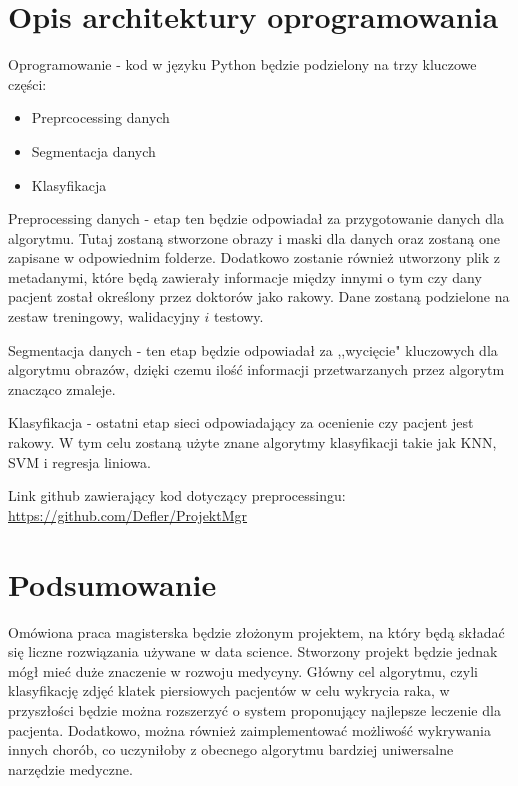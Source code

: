 \documentclass[10pt]{article}
\begin{document}
\section{Opis architektury oprogramowania}
Oprogramowanie - kod w języku Python będzie podzielony na trzy kluczowe części:

\begin{itemize}
  \item Preprcocessing danych

  \item Segmentacja danych

  \item Klasyfikacja

\end{itemize}
Preprocessing danych - etap ten będzie odpowiadał za przygotowanie danych dla algorytmu. Tutaj zostaną stworzone obrazy i maski dla danych oraz zostaną one zapisane w odpowiednim folderze. Dodatkowo zostanie również utworzony plik z metadanymi, które będą zawierały informacje między innymi o tym czy dany pacjent został określony przez doktorów jako rakowy. Dane zostaną podzielone na zestaw treningowy, walidacyjny $i$ testowy.

Segmentacja danych - ten etap będzie odpowiadał za ,,wycięcie" kluczowych dla algorytmu obrazów, dzięki czemu ilość informacji przetwarzanych przez algorytm znacząco zmaleje.

Klasyfikacja - ostatni etap sieci odpowiadający za ocenienie czy pacjent jest rakowy. W tym celu zostaną użyte znane algorytmy klasyfikacji takie jak KNN, SVM i regresja liniowa.

Link github zawierający kod dotyczący preprocessingu: \href{https://github.com/Defler/ProjektMgr}{https://github.com/Defler/ProjektMgr}

\section{Podsumowanie}
Omówiona praca magisterska będzie złożonym projektem, na który będą składać się liczne rozwiązania używane w data science. Stworzony projekt będzie jednak mógł mieć duże znaczenie w rozwoju medycyny. Główny cel algorytmu, czyli klasyfikację zdjęć klatek piersiowych pacjentów w celu wykrycia raka, w przyszłości będzie można rozszerzyć o system proponujący najlepsze leczenie dla pacjenta. Dodatkowo, można również zaimplementować możliwość wykrywania innych chorób, co uczyniłoby z obecnego algorytmu bardziej uniwersalne narzędzie medyczne.
\end{document}

